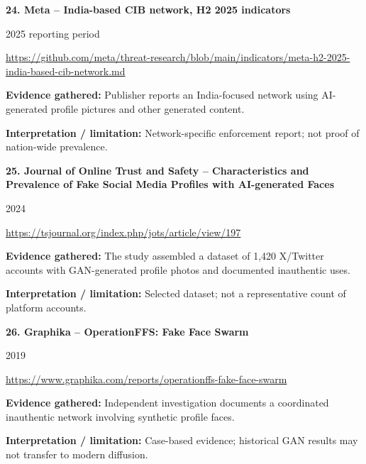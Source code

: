 \documentclass[11pt,a4paper]{article}
\begin{document}
\noindent\begin{minipage}{\linewidth}\textbf{24. Meta -- India-based CIB network, H2 2025 indicators}\par{\small 2025 reporting period\par\url{https://github.com/meta/threat-research/blob/main/indicators/meta-h2-2025-india-based-cib-network.md}}\par
\textbf{Evidence gathered:} Publisher reports an India-focused network using AI-generated profile pictures and other generated content.\par\textbf{Interpretation / limitation:} Network-specific enforcement report; not proof of nation-wide prevalence.\par
\end{minipage}\par\vspace{2mm}
\noindent\begin{minipage}{\linewidth}\textbf{25. Journal of Online Trust and Safety -- Characteristics and Prevalence of Fake Social Media Profiles with AI-generated Faces}\par{\small 2024\par\url{https://tsjournal.org/index.php/jots/article/view/197}}\par
\textbf{Evidence gathered:} The study assembled a dataset of 1,420 X/Twitter accounts with GAN-generated profile photos and documented inauthentic uses.\par\textbf{Interpretation / limitation:} Selected dataset; not a representative count of platform accounts.\par
\end{minipage}\par\vspace{2mm}
\noindent\begin{minipage}{\linewidth}\textbf{26. Graphika -- OperationFFS: Fake Face Swarm}\par{\small 2019\par\url{https://www.graphika.com/reports/operationffs-fake-face-swarm}}\par
\textbf{Evidence gathered:} Independent investigation documents a coordinated inauthentic network involving synthetic profile faces.\par\textbf{Interpretation / limitation:} Case-based evidence; historical GAN results may not transfer to modern diffusion.\par
\end{minipage}\par\vspace{2mm}
\end{document}
